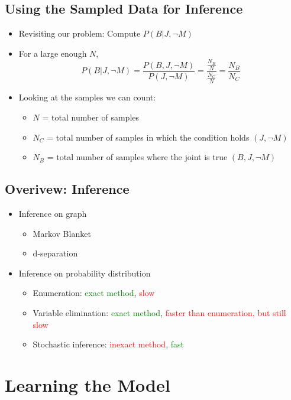 \documentclass[10pt]{article}
\begin{document}
\subsection*{Using the Sampled Data for Inference}
\begin{itemize}
	\item Revisiting our problem: Compute $P(B | J, \neg M)$
	\item For a large enough $N$,
	\[P(B | J, \neg M) = \frac{P(B, J, \neg M)}{P(J, \neg M)} = \frac{\frac{N_B}{N}}{\frac{N_C}{N}} = \frac{N_B}{N_C}\]
    \item Looking at the samples we can count:
    \begin{itemize}
	    \item $N$ = total number of samples
	    \item $N_C$ = total number of samples in which the condition holds $(J, \neg M)$
	    \item $N_B$ = total number of samples where the joint is true $(B, J, \neg M)$
    \end{itemize}
\end{itemize}

\subsection*{Overivew: Inference}
\begin{itemize}
	\item Inference on graph
	\begin{itemize}
	    \item Markov Blanket
	    \item d-separation
    \end{itemize}
    \item Inference on probability distribution
    \begin{itemize}
	    \item Enumeration: \textcolor{green}{exact method}, \textcolor{red}{slow}
	    \item Variable elimination: \textcolor{green}{exact method}, \textcolor{red}{faster than enumeration, but still slow}
	    \item Stochastic inference: \textcolor{red}{inexact method}, \textcolor{green}{fast}
    \end{itemize}
\end{itemize}

\section*{Learning the Model}
\end{document}
